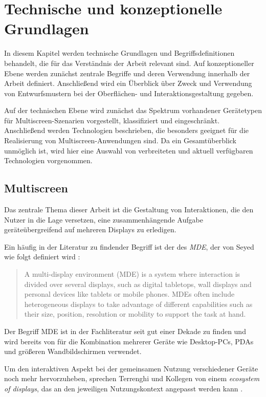 \chapter{Technische und konzeptionelle Grundlagen}
\label{ch:grundlagen}
In diesem Kapitel werden technische Grundlagen und Begriffsdefinitionen behandelt, die für das Verständnis der Arbeit relevant sind. Auf konzeptioneller Ebene werden zunächst zentrale Begriffe und deren Verwendung innerhalb der Arbeit definiert. Anschließend wird ein Überblick über Zweck und Verwendung von Entwurfsmustern bei der Oberflächen- und Interaktionsgestaltung gegeben. 

Auf der technischen Ebene wird zunächst das Spektrum vorhandener Gerätetypen für Multiscreen-Szenarien vorgestellt, klassifiziert und eingeschränkt. Anschließend werden Technologien beschrieben, die besonders geeignet für die Realisierung von Multiscreen-Anwendungen sind. Da ein Gesamtüberblick unmöglich ist, wird hier eine Auswahl von verbreiteten und aktuell verfügbaren Technologien vorgenommen.

\section{Multiscreen}
\label{sec:multiscreen}
Das zentrale Thema dieser Arbeit ist die Gestaltung von Interaktionen, die den Nutzer in die Lage versetzen, eine zusammenhängende Aufgabe geräteübergreifend auf mehreren Displays zu erledigen.

Ein häufig in der Literatur zu findender Begriff ist der des \textit{\ac{MDE}}, der von Seyed \ua wie folgt definiert wird \citep{Seyed2012}:
\begin{quote}
A multi-display environment (MDE) is a system where
interaction is divided over several displays, such as digital
tabletops, wall displays and personal devices like tablets or
mobile phones. MDEs often include heterogeneous displays
to take advantage of different capabilities such as their size,
position, resolution or mobility to support the task at hand.
\end{quote}

Der Begriff \ac{MDE} ist in der Fachliteratur seit gut einer Dekade zu finden und wird bereits von \cite{Rekimoto1997} für die Kombination mehrerer Geräte wie Desktop-PCs, \acp{PDA} und größeren Wandbildschirmen verwendet.

Um den interaktiven Aspekt bei der gemeinsamen Nutzung verschiedener Geräte noch mehr hervorzuheben, sprechen Terrenghi und Kollegen von einem \textit{ecosystem of displays}, das an den jeweiligen Nutzungskontext angepasst werden kann \citep{Terrenghi2009}. 


